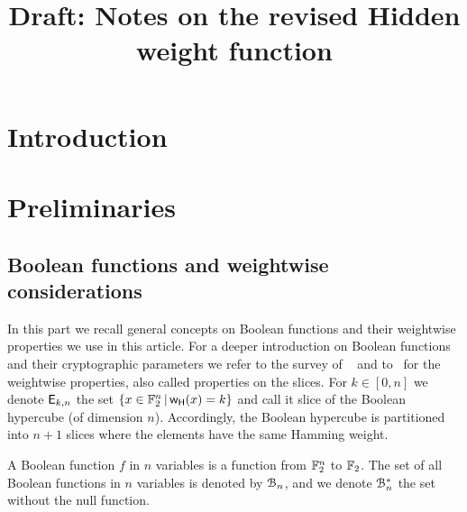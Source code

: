 \documentclass[11pt]{llncs}
\begin{document}
	\title{Draft: Notes on the revised Hidden weight function}

	
	\author{
	}
	
	
	

	
	
	
	\maketitle


	
	\begin{abstract}
	
		
	\end{abstract}


\section{Introduction}

\section{Preliminaries}


\subsection{Boolean functions and weightwise considerations}

In this part we recall general concepts on Boolean functions and their weightwise properties we use in this article. 
For a deeper introduction on Boolean functions and their cryptographic parameters we refer to the survey of \eg~\cite{Carlet20} and to~\cite{TOSC:CarMeaRot17} for the weightwise properties, also called properties on the slices.
For $k \in [0,n]$ we denote $\mathsf{E}_{k,n}$ the set $\{x\in \mathbb{F}_2^n \, | \, \mathsf{w_H}(x)=k  \}$ and call it slice of the Boolean hypercube (of dimension $n$). 
Accordingly, the Boolean hypercube is partitioned into $n+1$ slices where the elements have the same Hamming weight.

\begin{definition}\label{def:bool_f}
	A Boolean function $f$ in $n$ variables is a function from $\mathbb{F}_2^n$ to $\mathbb{F}_2$. 
	The set of all Boolean functions in $n$ variables is denoted by $\mathcal{B}_n$, and we denote $\mathcal{B}_n^*$ the set without the null function.
\end{definition}
\end{document}
